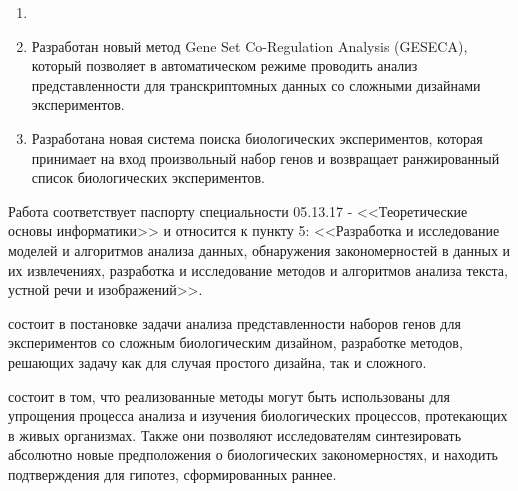 {}
\begin{enumerate}[beginpenalty=10000] %
  \item {}
  \item Разработан новый метод Gene Set Co-Regulation Analysis (GESECA), который позволяет  в автоматическом режиме проводить анализ представленности для транскриптомных данных со сложными дизайнами экспериментов.
  \item Разработана новая система поиска биологических экспериментов, которая принимает на вход произвольный набор генов и возвращает ранжированный список биологических экспериментов.
\end{enumerate}



{\passport} Работа соответствует паспорту специальности 05.13.17 - <<Теоретические основы информатики>> и относится к пункту 5: <<Разработка и исследование моделей и алгоритмов анализа данных, обнаружения закономерностей в данных и их извлечениях, разработка и исследование методов и алгоритмов анализа текста, устной речи и изображений>>.

{\theorinfluence} состоит в постановке задачи анализа представленности наборов генов для экспериментов со сложным биологическим дизайном, разработке методов, решающих задачу как для случая простого дизайна, так и сложного.

{\influence} состоит в том, что реализованные методы могут быть использованы для упрощения процесса анализа и изучения биологических процессов, протекающих в живых организмах. 
Также они позволяют исследователям синтезировать абсолютно новые предположения о биологических закономерностях, и находить подтверждения для гипотез, сформированных раннее. 

\fixme{{\methods} \ldots}




